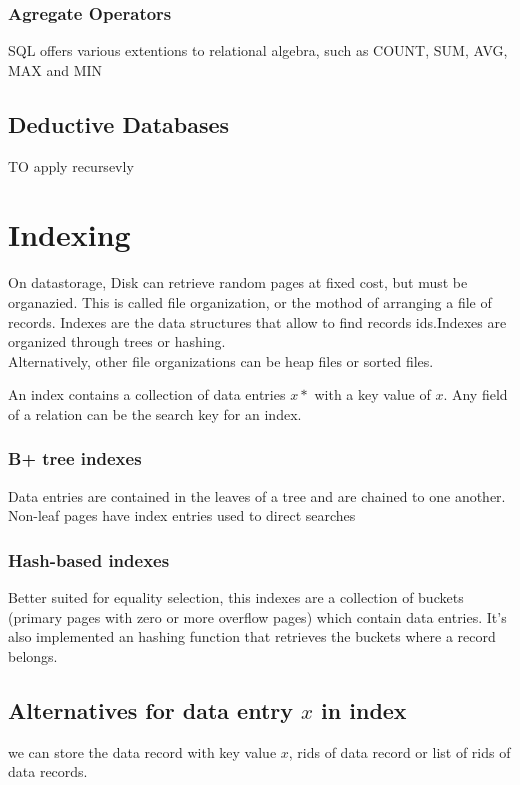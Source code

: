 \documentclass[12pt, a4paper]{article}
\begin{document}
\subsubsection{Agregate Operators}
SQL offers various extentions to relational algebra, such as COUNT, SUM, AVG, MAX and MIN

\subsection{Deductive Databases}
TO apply recursevly

\newpage
\section{Indexing}
On datastorage, Disk can retrieve random pages at fixed cost, but must be organazied. This is called file
organization, or the mothod of arranging a file of records. Indexes are the data structures that allow to 
find records ids.Indexes are organized through trees or hashing.\\Alternatively, other file organizations 
can be heap files or sorted files.

An index contains a collection of data entries $x*$ with a key value of $x$. Any field of a relation can be the
search key for an index.

\subsubsection{B+ tree indexes}
Data entries are contained in the leaves of a tree and are chained to one another. Non-leaf pages have index 
entries used to direct searches

\subsubsection{Hash-based indexes}
Better suited for equality selection, this indexes are a collection of buckets (primary pages with zero or more
overflow pages) which contain data entries. It's also implemented an hashing function that retrieves the buckets
where a record belongs. 

\subsection{Alternatives for data entry $x$ in index}
we can store the data record with key value $x$, rids of data record or list of rids of data records.
\end{document}
